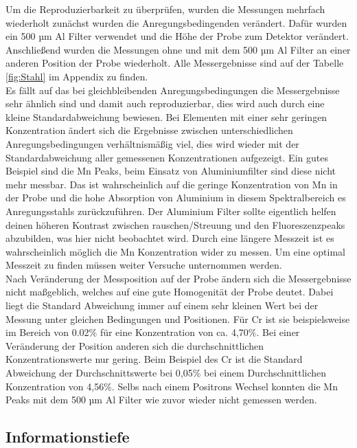 Um die Reproduzierbarkeit zu überprüfen, wurden die Messungen mehrfach wiederholt zunächst wurden die Anregungsbedingenden verändert. Dafür wurden ein 500 µm Al Filter verwendet und die Höhe der Probe zum Detektor verändert. Anschließend wurden die Messungen ohne und mit dem 500 µm Al Filter an einer anderen Position der Probe wiederholt. Alle Messergebnisse sind auf der Tabelle \ref{fig:Stahl} im Appendix zu finden.\\
Es fällt auf das bei gleichbleibenden Anregungsbedingungen die Messergebnisse sehr ähnlich sind und damit auch reproduzierbar, dies wird auch durch eine kleine Standardabweichung bewiesen.
Bei Elementen mit einer sehr geringen Konzentration ändert sich die Ergebnisse zwischen unterschiedlichen Anregungsbedingungen verhältnismäßig viel, dies wird wieder mit der Standardabweichung aller gemessenen Konzentrationen aufgezeigt. Ein gutes Beispiel sind die Mn Peaks, beim Einsatz von Aluminiumfilter sind diese nicht mehr messbar. Das ist wahrscheinlich auf die geringe Konzentration von Mn in der Probe und die hohe Absorption von Aluminium in diesem Spektralbereich es Anregungsstahls zurückzuführen. Der Aluminium Filter sollte eigentlich helfen deinen höheren Kontrast zwischen rauschen/Streuung und den Fluoreszenzpeaks abzubilden, was hier nicht beobachtet wird. Durch eine längere Messzeit ist es wahrscheinlich möglich die Mn Konzentration wider zu messen. Um eine optimal Messzeit zu finden müssen weiter Versuche unternommen werden. \\
Nach Veränderung der Messposition auf der Probe ändern sich die Messergebnisse nicht maßgeblich, welches auf eine gute Homogenität der Probe deutet. Dabei liegt die Standard Abweichung immer auf einem sehr kleinen Wert bei der Messung unter gleichen Bedingungen und Positionen. Für Cr ist sie beispielsweise im Bereich von 0.02$\%$ für eine Konzentration von ca. 4,70$\%$.  Bei einer Veränderung der Position anderen sich die durchschnittlichen Konzentrationswerte nur gering. Beim Beispiel des Cr ist die Standard Abweichung der Durchschnittswerte bei 0,05$\%$ bei einem Durchschnittlichen Konzentration von 4,56$\%$. Selbs nach einem Positrons Wechsel konnten die Mn Peaks mit dem 500 µm Al Filter wie zuvor wieder nicht gemessen werden. \\



\subsection{Informationstiefe}

